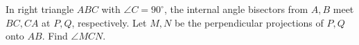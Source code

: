 In right triangle $ABC$ with $\angle C=90^\circ$, the internal angle bisectors from $A,B$ meet $BC,CA$ at $P,Q$, respectively. Let $M,N$ be the perpendicular projections of $P,Q$ onto $AB$. Find $\angle MCN$.
